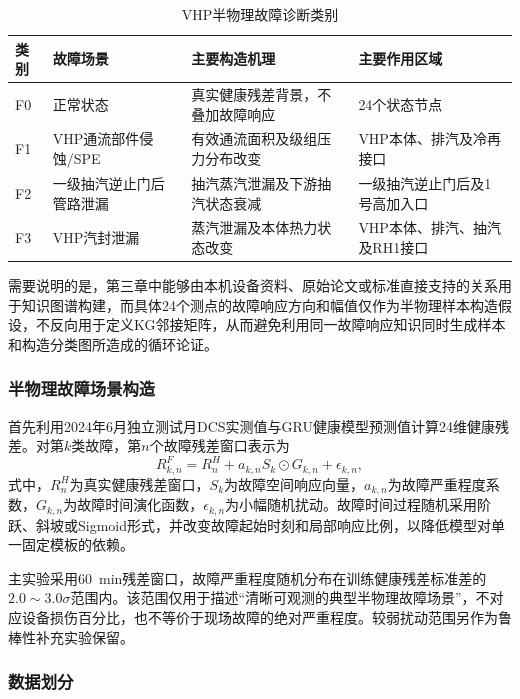 \begin{table}[htbp]
    \centering
    \caption{VHP半物理故障诊断类别}
    \label{tab:fault_classes_v3}
    \begin{tabular}{p{1.0cm}p{4.0cm}p{5.1cm}p{4.0cm}}
        \toprule
        类别 & 故障场景 & 主要构造机理 & 主要作用区域 \\
        \midrule
        F0 & 正常状态 & 真实健康残差背景，不叠加故障响应 & 24个状态节点 \\
        F1 & VHP通流部件侵蚀/SPE & 有效通流面积及级组压力分布改变 & VHP本体、排汽及冷再接口 \\
        F2 & 一级抽汽逆止门后管路泄漏 & 抽汽蒸汽泄漏及下游抽汽状态衰减 & 一级抽汽逆止门后及1号高加入口 \\
        F3 & VHP汽封泄漏 & 蒸汽泄漏及本体热力状态改变 & VHP本体、排汽、抽汽及RH1接口 \\
        \bottomrule
    \end{tabular}
\end{table}

需要说明的是，第三章中能够由本机设备资料、原始论文或标准直接支持的关系用于知识图谱构建，而具体24个测点的故障响应方向和幅值仅作为半物理样本构造假设，不反向用于定义KG邻接矩阵，从而避免利用同一故障响应知识同时生成样本和构造分类图所造成的循环论证。

\subsubsection{半物理故障场景构造}

首先利用2024年6月独立测试月DCS实测值与GRU健康模型预测值计算24维健康残差。对第$k$类故障，第$n$个故障残差窗口表示为
\begin{equation}
R_{k,n}^{F}=R_n^{H}+a_{k,n}S_k\odot G_{k,n}+\epsilon_{k,n},
\end{equation}
式中，$R_n^{H}$为真实健康残差窗口，$S_k$为故障空间响应向量，$a_{k,n}$为故障严重程度系数，$G_{k,n}$为故障时间演化函数，$\epsilon_{k,n}$为小幅随机扰动。故障时间过程随机采用阶跃、斜坡或Sigmoid形式，并改变故障起始时刻和局部响应比例，以降低模型对单一固定模板的依赖。

主实验采用60~min残差窗口，故障严重程度随机分布在训练健康残差标准差的$2.0\sim3.0\sigma$范围内。该范围仅用于描述“清晰可观测的典型半物理故障场景”，不对应设备损伤百分比，也不等价于现场故障的绝对严重程度。较弱扰动范围另作为鲁棒性补充实验保留。

\subsubsection{数据划分}

